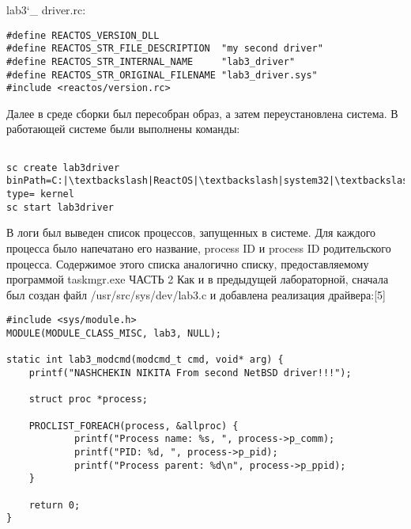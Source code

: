 \documentclass[a4paper, 14pt]{extarticle}
\begin{document}
\begin{flushleft}
lab3\char`_ driver.rc:
\end{flushleft}

\begin{verbatim}
#define REACTOS_VERSION_DLL
#define REACTOS_STR_FILE_DESCRIPTION  "my second driver"
#define REACTOS_STR_INTERNAL_NAME     "lab3_driver"
#define REACTOS_STR_ORIGINAL_FILENAME "lab3_driver.sys"
#include <reactos/version.rc>
\end{verbatim}

\begin{flushleft}
Далее в среде сборки был пересобран образ, а затем переустановлена система. В работающей системе были выполнены команды:
\end{flushleft}

\begin{verbatim}

sc create lab3driver binPath=C:|\textbackslash|ReactOS|\textbackslash|system32|\textbackslash|drivers|\textbackslash|lab3_driver.sys type= kernel
sc start lab3driver

\end{verbatim}

\begin{flushleft}
В логи был выведен список процессов, запущенных в системе. Для каждого процесса было напечатано его название, process ID и process ID родительского процесса. Содержимое этого списка аналогично списку, предоставляемому программой taskmgr.exe \newline \newline
ЧАСТЬ 2 \newline
Как и в предыдущей лабораторной, сначала был создан файл /usr/src/sys/dev/lab3.c и добавлена реализация драйвера:[5]
\end{flushleft}

\begin{verbatim}
#include <sys/module.h>
MODULE(MODULE_CLASS_MISC, lab3, NULL);

static int lab3_modcmd(modcmd_t cmd, void* arg) {
	printf("NASHCHEKIN NIKITA From second NetBSD driver!!!");
	
	struct proc *process;
	
	PROCLIST_FOREACH(process, &allproc) {
			printf("Process name: %s, ", process->p_comm);
			printf("PID: %d, ", process->p_pid);
			printf("Process parent: %d\n", process->p_ppid);
	}
	
	return 0;
}
\end{verbatim}
\end{document}
